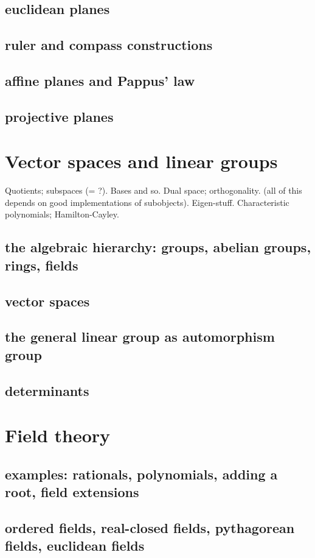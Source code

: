 \documentclass[a4,12pt]{amsbook}
\begin{document}
\section{euclidean planes}
\section{ruler and compass constructions}
\section{affine planes and Pappus' law}
\section{projective planes}
\chapter{Vector spaces and linear groups}
Quotients; subspaces (= ?). Bases and so. Dual space; orthogonality. (all of this depends on good implementations of subobjects). Eigen-stuff. Characteristic polynomials; Hamilton-Cayley. 
\section{the algebraic hierarchy: groups, abelian groups, rings, fields}
\section{vector spaces}
\section{the general linear group as automorphism group}
\section{determinants}
\chapter{Field theory}
\section{examples: rationals, polynomials, adding a root, field extensions}
\section{ordered fields, real-closed fields, pythagorean fields, euclidean fields}
\end{document}
